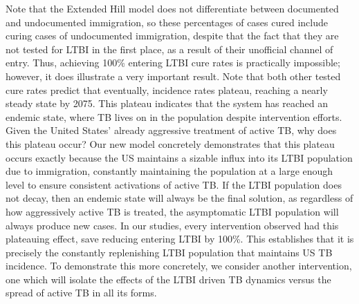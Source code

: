 \documentclass{amsart}
\renewcommand{\(}{\left(}
\renewcommand{\)}{\right)}
\begin{document}
Note that the Extended Hill model does not differentiate between documented and
undocumented immigration, so these percentages of cases cured include curing
cases of undocumented immigration, despite that the fact that they are not
tested for LTBI in the first place, as a result of their unofficial channel of
entry. Thus, achieving 100\% entering LTBI cure rates is practically impossible;
however, it does illustrate a very important result.  Note that both other
tested cure rates predict that eventually, incidence rates plateau, reaching a
nearly steady state by 2075.  This plateau indicates that the system has reached
an endemic state, where TB lives on in the population despite intervention
efforts. Given the United States' already aggressive treatment of active TB, why
does this plateau occur?  Our new model concretely demonstrates that this
plateau occurs exactly because the US maintains a sizable influx into its LTBI
population due to immigration, constantly maintaining the population at a large
enough level to ensure consistent activations of active TB. If the LTBI
population does not decay, then an endemic state will always be the final
solution, as regardless of how aggressively active TB is treated, the
asymptomatic LTBI population will always produce new cases. In our studies,
every intervention observed had this plateauing effect, save reducing entering
LTBI by 100\%. This establishes that it is precisely the constantly replenishing
LTBI population that maintains US TB incidence. To demonstrate this more
concretely, we consider another intervention, one which will isolate the effects
of the LTBI driven TB dynamics versus the spread of active TB in all its forms. 
\end{document}
